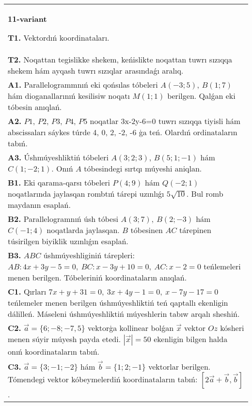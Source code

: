 \documentclass{article}
\begin{document}
\begin{tabular}{m{17cm}}
\textbf{11-variant}

\textbf{T1.} 
Vektordıń koordinataları.
 \\
\textbf{T2.} 
Noqattan tegislikke shekem, keńislikte noqattan tuwrı sızıqqa shekem hám ayqash tuwrı sızıqlar arasındaǵı aralıq.
 \\
\textbf{A1.} 
Parallelogrammnıń eki qońsılas tóbeleri $A (-3;5) $, $B (1;7) $
hám dioganallarınıń kesilisiw noqatı $M (1;1) $ berilgen. Qalǵan eki
tóbesin anıqlań.
 \\
\textbf{A2.} 
$P1$, $P2$, $P3$, $P4$, $P5$ noqatlar
3x-2y-6=0 tuwrı sızıqqa tiyisli hám abscissaları sáykes túrde
4, 0, 2, -2, -6 ģa teń. Olardıń ordinataların tabıń.
 \\
\textbf{A3.} 
Úshmúyeshliktiń tóbeleri
$A (3;2; 3) $, $B (5;1; - 1) $ hám $C (1; -2;1) $. Onıń $A$ tóbesindegi sırtqı múyeshi aniqlan.
 \\
\textbf{B1.} 
Eki qarama-qarsı tóbeleri \(P (4;9) \) hám \(Q (-2; 1) \) noqatlarında jaylasqan rombtıń tárepi uzınlıǵı \(5\sqrt{10}\). Bul
romb maydanın esaplań.
 \\
\textbf{B2.} 
Parallelogramnıń úsh tóbesi \(A (3;7),\ B (2;-3) \) hám
\(C (-1;4) \) noqatlarda jaylasqan. $B$ tóbesinen $AC$
tárepinen túsirilgen biyiklik uzınlıǵın esaplań.
 \\
\textbf{B3.} 
$ABC$ úshmúyeshliginiń tárepleri:
\(AB:4x+3y-5=0,\ BC:x-3y+10=0,\ AC:x-2=0\)
teńlemeleri menen berilgen. Tóbeleriniń koordinataların anıqlań.
 \\
\textbf{C1.} 
Qırları
\(7x+y+31=0,\ 3x+4y-1=0,\ x-7y-17=0\) teńlemeler
menen berilgen úshmúyeshliktiń teń qaptallı ekenligin dálilleń.
Máseleni úshmúyeshliktiń
múyeshlerin tabıw arqalı sheshiń.
 \\
\textbf{C2.} 
$\vec{a} = \{ 6; - 8; - 7,5\}$ vektorģa kollinear bolǵan $\vec{x}$ vektor $Oz$ kósheri menen súyir múyesh payda etedi. $|\vec{x}| = 50$ ekenligin bilgen halda onıń koordinataların tabıń.
 \\
\textbf{C3.} 
$\vec{a} = \{ 3; - 1; - 2\}$ hám $\vec{b} = \{ 1;2; - 1\}$ vektorlar berilgen. Tómendegi vektor kóbeymelerdiń koordinataların tabıń:
$\left\lbrack 2\vec{a} + \vec{b},\vec{b} \right\rbrack$.
 \\

\end{tabular}
\vspace{1cm}
\end{document}
